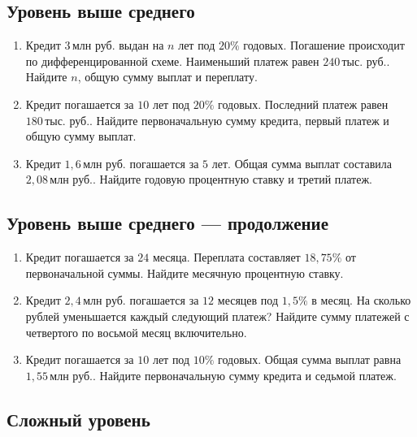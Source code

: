 \documentclass[a4paper,12pt]{article}
\newcommand{\mln}{\,\text{млн руб.}}
\newcommand{\thousand}{\,\text{тыс. руб.}}
\begin{document}
\subsection*{Уровень выше среднего}

\begin{enumerate}[
  leftmargin=1.8em,
  label=\textbf{\arabic*.},
  start=4,
  itemsep=0.9em
]
  \item Кредит $3\mln$ выдан на $n$ лет под $20\%$ годовых.
        Погашение происходит по дифференцированной схеме. Наименьший
        платеж равен $240\thousand$. Найдите $n$, общую сумму выплат
        и переплату.

  \item Кредит погашается за $10$ лет под $20\%$ годовых.
        Последний платеж равен $180\thousand$. Найдите первоначальную
        сумму кредита, первый платеж и общую сумму выплат.

  \item Кредит $1{,}6\mln$ погашается за $5$ лет. Общая сумма выплат
        составила $2{,}08\mln$. Найдите годовую процентную ставку
        и третий платеж.
\end{enumerate}

\clearpage

\subsection*{Уровень выше среднего --- продолжение}

\begin{enumerate}[
  leftmargin=1.8em,
  label=\textbf{\arabic*.},
  start=7,
  itemsep=0.9em
]
  \item Кредит погашается за $24$ месяца. Переплата составляет
        $18{,}75\%$ от первоначальной суммы. Найдите месячную
        процентную ставку.

  \item Кредит $2{,}4\mln$ погашается за $12$ месяцев под $1{,}5\%$
        в месяц. На сколько рублей уменьшается каждый следующий платеж?
        Найдите сумму платежей с четвертого по восьмой месяц
        включительно.

  \item Кредит погашается за $10$ лет под $10\%$ годовых. Общая сумма
        выплат равна $1{,}55\mln$. Найдите первоначальную сумму кредита
        и седьмой платеж.
\end{enumerate}

\subsection*{Сложный уровень}
\end{document}
